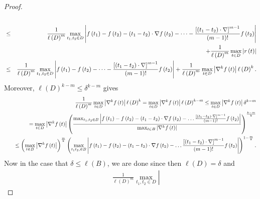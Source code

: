 \documentclass{amsart}
\theoremstyle{plain}
\numberwithin{equation}{section}
\begin{document}
\begin{proof}
\begin{eqnarray}
\label{dom high'} \\
&\leq &\frac{1}{\ell \left( D\right) ^{m}}\max_{t_{1},t_{2}\in D}\left\vert
f\left( t_{1}\right) -f\left( t_{2}\right) -\left( t_{1}-t_{2}\right) \cdot
\nabla f\left( t_{2}\right) -\dots -\frac{\left[ \left( t_{1}-t_{2}\right)
\cdot \nabla \right] ^{m-1}}{(m-1)!}f\left( t_{2}\right) \right\vert \\
&\quad &+\frac{1}{\ell \left( D\right) ^{m}}\max_{t\in D}\left\vert r\left(
t\right) \right\vert  \notag \\
&\leq &\frac{1}{\ell \left( D\right) ^{m}}\max_{t_{1},t_{2}\in D}\left\vert
f\left( t_{1}\right) -f\left( t_{2}\right) -\dots -\frac{\left[ \left(
t_{1}-t_{2}\right) \cdot \nabla \right] ^{m-1}}{(m-1)!}f\left( t_{2}\right)
\right\vert +\frac{1}{\ell \left( D\right) ^{m}}\max_{t\in D}\left\vert
\nabla ^{k}f\left( t\right) \right\vert \ell \left( D\right) ^{k}.  \notag
\end{eqnarray}%
Moreover, $\ell \left( D\right) ^{k-m}\leq \delta ^{k-m}$ gives 
\begin{eqnarray*}
&&\frac{1}{\ell \left( D\right) ^{m}}\max_{t\in D}\left\vert \nabla
^{k}f\left( t\right) \right\vert \ell \left( D\right) ^{k}=\max_{t\in
D}\left\vert \nabla ^{k}f\left( t\right) \right\vert \ell \left( D\right)
^{k-m}\leq \max_{t\in D}\left\vert \nabla ^{k}f\left( t\right) \right\vert
\delta ^{k-m} \\
&&\quad =\max_{t\in D}\left\vert \nabla ^{k}f\left( t\right) \right\vert
\left( \frac{\max_{t_{1},t_{2}\in B}\left\vert f\left( t_{1}\right) -f\left(
t_{2}\right) -\left( t_{1}-t_{2}\right) \cdot \nabla f\left( t_{2}\right)
-\dots \frac{\left[ \left( t_{1}-t_{2}\right) \cdot \nabla \right] ^{m-1}}{%
(m-1)!}f\left( t_{2}\right) \right\vert }{\max_{t\in B}\left\vert \nabla
^{k}f\left( t\right) \right\vert }\right) ^{\frac{k-m}{k}} \\
&&\quad \leq \left( \max_{t\in B}\left\vert \nabla ^{k}f\left( t\right)
\right\vert \right) ^{\frac{m}{k}}\left( \max_{t_{1}t_{2},\in B}\left\vert
f\left( t_{1}\right) -f\left( t_{2}\right) -\left( t_{1}-t_{2}\right) \cdot
\nabla f\left( t_{2}\right) -\dots \frac{\left[ \left( t_{1}-t_{2}\right)
\cdot \nabla \right] ^{m-1}}{(m-1)!}f\left( t_{2}\right) \right\vert \right)
^{1-\frac{m}{k}}.
\end{eqnarray*}%
Now in the case that $\delta \leq \ell \left( B\right) $, we are done since
then $\ell \left( D\right) =\delta $ and 
\begin{eqnarray*}
&&\frac{1}{\ell \left( D\right) ^{m}}\max_{t_{1},t_{2}\in D}\left\vert

\end{eqnarray*}
\end{proof}
\end{document}
